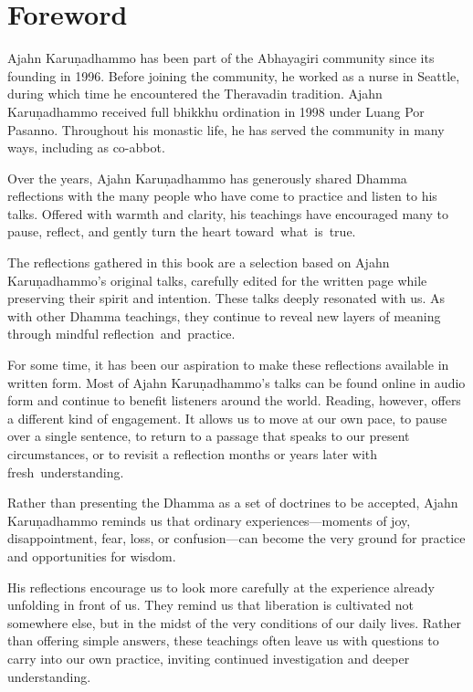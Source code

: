 \chapter{Foreword}

Ajahn Karuṇadhammo has been part of the Abhayagiri community since its founding in 1996. Before joining the community, he worked as a nurse in Seattle, during which time he encountered the Theravadin tradition. Ajahn Karuṇadhammo received full bhikkhu ordination in 1998 under Luang Por Pasanno. Throughout his monastic life, he has served the community in many ways, including as co-abbot.

Over the years, Ajahn Karuṇadhammo has generously shared Dhamma reflections with the many people who have come to practice and listen to his talks. Offered with warmth and clarity, his teachings have encouraged many to pause, reflect, and gently turn the heart \mbox{toward what is true.}

The reflections gathered in this book are a selection based on Ajahn Karuṇadhammo's original talks, carefully edited for the written page while preserving their spirit and intention. These talks deeply resonated with us. As with other Dhamma teachings, they continue to reveal new layers of meaning through mindful \mbox{reflection and practice.}

For some time, it has been our aspiration to make these reflections available in written form. Most of Ajahn Karuṇadhammo's talks can be found online in audio form and continue to benefit listeners around the world. Reading, however, offers a different kind of engagement. It allows us to move at our own pace, to pause over a single sentence, to return to a passage that speaks to our present circumstances, or to revisit a reflection months or years later with \mbox{fresh understanding.}

Rather than presenting the Dhamma as a set of doctrines to be accepted, Ajahn Karuṇadhammo reminds us that ordinary experiences---moments of joy, disappointment, fear, loss, or confusion---can become the very ground for practice and opportunities for wisdom.

His reflections encourage us to look more carefully at the experience already unfolding in front of us. They remind us that liberation is cultivated not somewhere else, but in the midst of the very conditions of our daily lives. Rather than offering simple answers, these teachings often leave us with questions to carry into our own practice, inviting continued investigation and deeper understanding.

